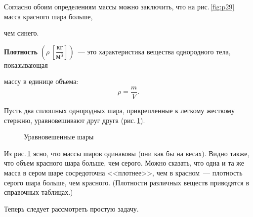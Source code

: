 \documentclass[main.tex]{subfiles}
\begin{document}
Согласно обоим определениям массы можно заключить, что на рис.\,\ref{fig:p29} масса красного шара больше, \strut чем синего.  

\textbf{Плотность} $\left(\rho\ \left[\dfrac{\text{кг}}{\text{м}^3}\right]\right)$~--- это характеристика вещества однородного тела, показывающая \strut массу в единице объема:
\begin{equation}
    \label{23mass_e1}
    \rho=\dfrac{m}{V}.
\end{equation}

Пусть два сплошных однородных шара, прикрепленные  к легкому жесткому стержню, уравновешивают друг друга (рис.\,\ref{fig:p30}).

    \begin{figure}[H]
    \centering

\caption{Уравновешенные шары}
\label{fig:p30}
\end{figure}

Из рис.\,\ref{fig:p30} ясно, что массы шаров одинаковы (они как бы на весах). Видно также, что объем красного шара больше, чем серого. Можно сказать, что одна и та же масса в сером шаре сосредоточна <<плотнее>>, чем в красном~--- плотность серого шара больше, чем красного. (Плотности различных веществ приводятся в справочных таблицах.)

Теперь следует рассмотреть простую задачу.
\end{document}
